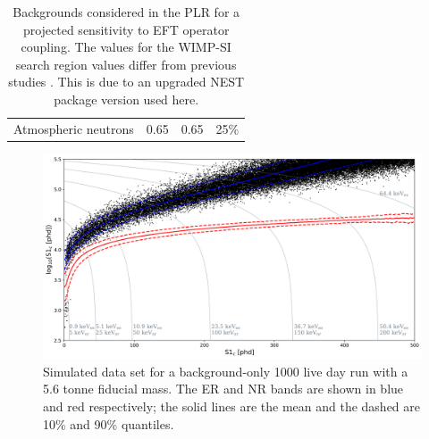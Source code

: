 \begin{table}[]
\begin{tabular}{c|c|c|c}
        Atmospheric neutrons                         & 0.65                   & 0.65                    & 25\% \cite{atmospheric_neutrinos_rate_ref}      
    \end{tabular}
    \caption{Backgrounds considered in the PLR for a projected sensitivity to EFT operator coupling. The values for the WIMP-SI search region values differ from previous studies \cite{LZ_projected_sensitivity_paper_ref,LZ_Ibles_LZStats_Thesis_ref}. This is due to an upgraded NEST package version used here.}
    \label{tab:projected_lz_backgrounds}
\end{table}



\begin{figure}
    \centering
    \includegraphics[width=15cm]{Figures/EFT/Projected_backgrounds/projected_backgrounds_s1_s2.png}
    \caption{Simulated data set for a background-only 1000 live day run with a 5.6 tonne fiducial mass. The ER and NR bands are shown in blue and red respectively; the solid lines are the mean and the dashed are 10\% and 90\% quantiles.}
    \label{fig:my_label}
\end{figure}


